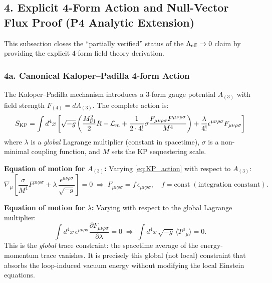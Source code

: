 \subsection{4. Explicit 4-Form Action and Null-Vector Flux Proof (P4 Analytic Extension)}

This subsection closes the ``partially verified'' status of the $\Lambda_{\rm eff} \to 0$ claim by providing the explicit 4-form field theory derivation.

\subsubsection{4a. Canonical Kaloper--Padilla 4-form Action}

The Kaloper--Padilla mechanism \cite{Kaloper2014} introduces a 3-form gauge potential $A_{(3)}$ with field strength $F_{(4)} = dA_{(3)}$.
The complete action is:
\begin{equation}
S_{\rm KP} = \int d^4x \left[ \sqrt{-g}\left(\frac{M_{\rm Pl}^2}{2}R - \mathcal{L}_m + \frac{1}{2\cdot 4!}\sigma \frac{F_{\mu\nu\rho\sigma}F^{\mu\nu\rho\sigma}}{M^4}\right) + \frac{\lambda}{4!}\epsilon^{\mu\nu\rho\sigma}F_{\mu\nu\rho\sigma} \right]
\label{eq:KP_action}
\end{equation}
where $\lambda$ is a \emph{global} Lagrange multiplier (constant in spacetime), $\sigma$ is a non-minimal coupling function, and $M$ sets the KP sequestering scale.

\textbf{Equation of motion for $A_{(3)}$:}
Varying \eqref{eq:KP_action} with respect to $A_{(3)}$:
\begin{equation}
\nabla_\mu\!\left[\frac{\sigma}{M^4} F^{\mu\nu\rho\sigma} + \lambda \,\frac{\epsilon^{\mu\nu\rho\sigma}}{\sqrt{-g}}\right] = 0
\;\Rightarrow\;
F_{\mu\nu\rho\sigma} = f \,\epsilon_{\mu\nu\rho\sigma},\quad f = \text{const}\;(\text{integration constant}).
\label{eq:F4_EOM}
\end{equation}

\textbf{Equation of motion for $\lambda$:}
Varying with respect to the global Lagrange multiplier:
\begin{equation}
\int d^4x\, \epsilon^{\mu\nu\rho\sigma}\frac{\partial F_{\mu\nu\rho\sigma}}{\partial\lambda} = 0
\;\Rightarrow\;
\int d^4x\,\sqrt{-g}\,\bigl\langle T^\mu{}_\mu\bigr\rangle = 0.
\label{eq:lambda_EOM}
\end{equation}
This is the \emph{global} trace constraint: the spacetime average of the energy-momentum trace vanishes. It is precisely this global (not local) constraint that absorbs the loop-induced vacuum energy without modifying the local Einstein equations.

